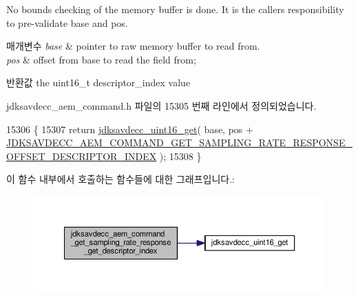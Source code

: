 No bounds checking of the memory buffer is done. It is the caller\textquotesingle{}s responsibility to pre-\/validate base and pos.


\begin{DoxyParams}{매개변수}
{\em base} & pointer to raw memory buffer to read from. \\
\hline
{\em pos} & offset from base to read the field from; \\
\hline
\end{DoxyParams}
\begin{DoxyReturn}{반환값}
the uint16\+\_\+t descriptor\+\_\+index value 
\end{DoxyReturn}


jdksavdecc\+\_\+aem\+\_\+command.\+h 파일의 15305 번째 라인에서 정의되었습니다.


\begin{DoxyCode}
15306 \{
15307     \textcolor{keywordflow}{return} \hyperlink{group__endian_ga3fbbbc20be954aa61e039872965b0dc9}{jdksavdecc\_uint16\_get}( base, pos + 
      \hyperlink{group__command__get__sampling__rate__response_gabe500c46d8e13754810212a8bccc4430}{JDKSAVDECC\_AEM\_COMMAND\_GET\_SAMPLING\_RATE\_RESPONSE\_OFFSET\_DESCRIPTOR\_INDEX}
       );
15308 \}
\end{DoxyCode}


이 함수 내부에서 호출하는 함수들에 대한 그래프입니다.\+:
\nopagebreak
\begin{figure}[H]
\begin{center}
\leavevmode
\includegraphics[width=350pt]{group__command__get__sampling__rate__response_gada7b78ddb76b1d761c6785a28275227d_cgraph}
\end{center}
\end{figure}




